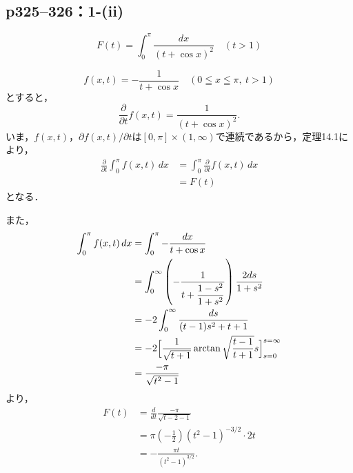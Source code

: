 \documentclass[a4paper,10pt,fleqn]{ltjsarticle}
\begin{document}
\newpage


\subsection*{p325--326：1-(ii)}

\begin{tleftbar}
    \[
        F(t) = \int_0^\pi \frac{dx}{(t + \cos x)^2} \quad (t > 1)
    \]

    \[
        f(x,t) = - \frac{1}{t+\cos x} \quad ( 0 \leqq x \leqq \pi , ~ t>1)
    \]
    とすると，
    \[
        \frac{\partial}{\partial t}  f(x,t) = \frac{1}{(t+\cos x)^2}.
    \]
    いま，$f(x,t)$，$\partial f(x,t) / \partial t $は$[0,\pi] \times (1,\infty)$で連続であるから，定理14.1により，
    \begin{align*}
        \frac{\partial}{\partial t} \int_0^\pi f(x,t) \, dx & = \int_0^\pi \frac{\partial}{\partial t} f(x,t) \, dx \\
                                                            & = F(t)
    \end{align*}
    となる．

    また，
    \begin{align*}
        \int_0^\pi f(x,t) \, dx & = \int_0^\pi - \frac{dx}{t+\cos x}                                                        \\
                                & = \int_0^\infty \left ( - \frac{1}{t+\dfrac{1-s^2}{1+s^2}} \right) \frac{2ds}{1+s^2}      \\
                                & = -2\int_0^\infty \frac{ds}{(t-1)s^2+t+1}                                                 \\
                                & = -2 \Bigl [ \frac{1}{\sqrt{t+1}} \arctan \sqrt{\frac{t-1}{t+1}}s \Bigr]_{s=0}^{s=\infty} \\
                                & = \frac{-\pi}{\sqrt{t^2-1}}
    \end{align*}
    より，
    \begin{align*}
        F(t) & = \frac{d}{dt} \frac{-\pi}{\sqrt{t-2-1}}                 \\
             & = \pi \left(-\frac{1}{2} \right) (t^2-1)^{-3/2} \cdot 2t \\
             & = -\frac{\pi t}{(t^2-1)^{3/2}}.
    \end{align*}
\end{tleftbar}
\end{document}
